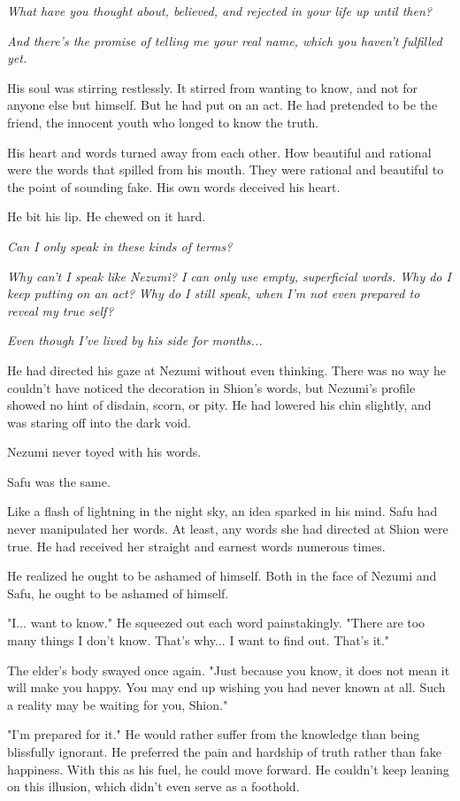 \emph{What have you thought about, believed, and rejected in your life up
	until then?}

\emph{And there's the promise of telling me your real name, which you haven't
	fulfilled yet.}

His soul was stirring restlessly. It stirred from wanting to know, and
not for anyone else but himself. But he had put on an act. He had
pretended to be the friend, the innocent youth who longed to know the
truth.

His heart and words turned away from each other. How beautiful and
rational were the words that spilled from his mouth. They were rational
and beautiful to the point of sounding fake. His own words deceived his
heart.

He bit his lip. He chewed on it hard.

\emph{Can I only speak in these kinds of terms?}

\emph{Why can't I speak like Nezumi? I can only use empty, superficial words.
	Why do I keep putting on an act? Why do I still speak, when I'm not even
	prepared to reveal my true self?}

\emph{Even though I've lived by his side for months...}

He had directed his gaze at Nezumi without even thinking. There was no
way he couldn't have noticed the decoration in Shion's words, but
Nezumi's profile showed no hint of disdain, scorn, or pity. He had
lowered his chin slightly, and was staring off into the dark void.

Nezumi never toyed with his words.

Safu was the same.

Like a flash of lightning in the night sky, an idea sparked in his mind.
Safu had never manipulated her words. At least, any words she had
directed at Shion were true. He had received her straight and earnest
words numerous times.

He realized he ought to be ashamed of himself. Both in the face of
Nezumi and Safu, he ought to be ashamed of himself.

"I... want to know." He squeezed out each word painstakingly. "There are
too many things I don't know. That's why... I want to find out. That's
it."

The elder's body swayed once again. "Just because you know, it does not
mean it will make you happy. You may end up wishing you had never known
at all. Such a reality may be waiting for you, Shion."

"I'm prepared for it." He would rather suffer from the knowledge than
being blissfully ignorant. He preferred the pain and hardship of truth
rather than fake happiness. With this as his fuel, he could move
forward. He couldn't keep leaning on this illusion, which didn't even
serve as a foothold.

